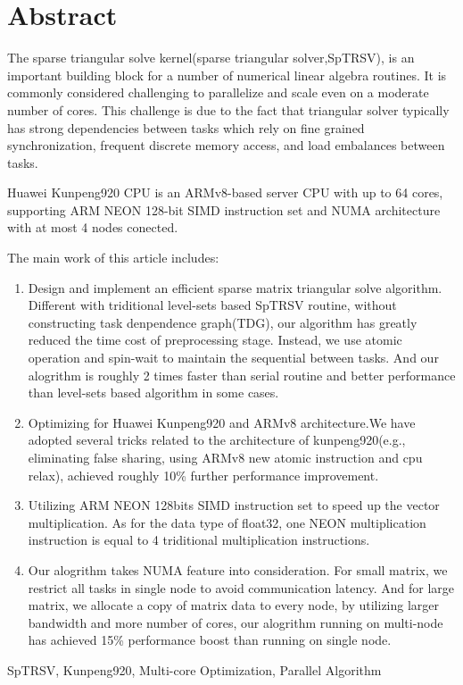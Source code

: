 ﻿\renewcommand{\baselinestretch}{1.5}
\fontsize{12pt}{13pt}\selectfont

\chapter[ABSTRACT]{Abstract}

The sparse triangular solve kernel(sparse triangular solver,SpTRSV), is an important building block for a number of numerical linear algebra routines. It is commonly considered challenging to parallelize and scale even on a moderate number of cores. This challenge is due to the fact that triangular solver typically has strong dependencies between tasks which rely on fine grained synchronization, frequent discrete memory access, and load embalances between tasks.

Huawei Kunpeng920 CPU is an ARMv8-based server CPU with up to 64 cores, supporting ARM NEON 128-bit SIMD instruction set and NUMA architecture with at most 4 nodes conected.

The main work of this article includes:
\vspace{-12pt}
\begin{enumerate} \setlength{\itemsep}{0pt}
    \item Design and implement an efficient sparse matrix triangular solve algorithm. Different with triditional level-sets based SpTRSV routine, without constructing task denpendence graph(TDG), our algorithm has greatly reduced the time cost of preprocessing stage. Instead, we use atomic operation and spin-wait to maintain the sequential between tasks. And our alogrithm is roughly 2 times faster than serial routine and better performance than level-sets based algorithm in some cases.
    \item Optimizing for Huawei Kunpeng920 and ARMv8 architecture.We have adopted several tricks related to the architecture of kunpeng920(e.g., eliminating false sharing, using ARMv8 new atomic instruction and cpu relax), achieved roughly 10\% further performance improvement.
    \item Utilizing ARM NEON 128bits SIMD instruction set to speed up the vector multiplication. As for the data type of float32, one NEON multiplication instruction is equal to 4 triditional multiplication instructions.
    \item Our alogrithm takes NUMA feature into consideration. For small matrix, we restrict all tasks in single node to avoid communication latency. And for large matrix, we allocate a copy of matrix data to every node, by utilizing larger bandwidth and more number of cores, our alogrithm running on multi-node has achieved 15\% performance boost than running on single node.
\end{enumerate}
\vspace{-12pt}


\vspace{1em}
 \quad SpTRSV, Kunpeng920, Multi-core Optimization, Parallel Algorithm

\clearpage
\endinput